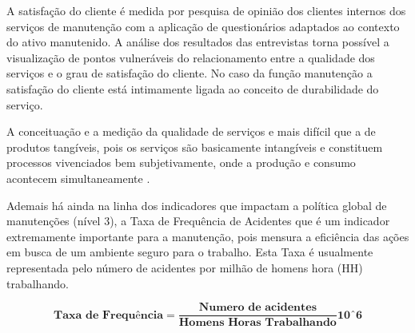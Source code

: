 A satisfação do cliente é medida por pesquisa de opinião dos clientes internos dos serviços de manutenção com a aplicação de questionários adaptados ao contexto do ativo manutenido. A análise dos resultados das entrevistas torna possível a visualização de pontos vulneráveis do  relacionamento entre a qualidade dos serviços e o grau de satisfação do cliente. No caso da função manutenção a satisfação do cliente está intimamente ligada ao conceito de durabilidade do serviço.

A conceituação e a medição da qualidade de serviços e mais difícil que a de produtos tangíveis, pois os serviços são basicamente intangíveis e constituem processos vivenciados bem subjetivamente, onde a produção e consumo acontecem simultaneamente \cite{junior2012satisfaccao}.

Ademais há ainda na linha dos indicadores que impactam a política global de manutenções (nível 3), a Taxa de Frequência de Acidentes que é um indicador extremamente importante para a manutenção, pois mensura a eficiência das ações em busca de um ambiente seguro para o trabalho. Esta Taxa é usualmente representada pelo número de acidentes por milhão de homens hora (HH) trabalhando.

\begin{equation}
\label{eqn07}
	\mathbf{\textrm{Taxa de Frequência}} = \mathbf{\frac{\textrm{Numero de acidentes}}{\textrm{Homens Horas Trabalhando}}{10ˆ6}} 
\end{equation}

